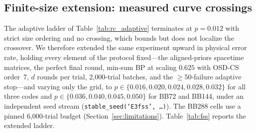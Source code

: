 \documentclass[pdflatex,sn-mathphys-num]{sn-jnl}
\theoremstyle{thmstyleone}
\theoremstyle{thmstyletwo}
\theoremstyle{thmstylethree}
\begin{document}
\subsection{Finite-size extension: measured curve crossings}
\label{ssec:fss}

The adaptive ladder of Table~\ref{tab:rc_adaptive} terminates at $p=0.012$ with strict size ordering and no crossing, which bounds but does not localize the crossover. We therefore extended the same experiment upward in physical error rate, holding every element of the protocol fixed---the aligned-priors spacetime matrices, the perfect final round, min-sum BP at scaling $0.625$ with OSD-CS order~7, $d$ rounds per trial, 2{,}000-trial batches, and the $\ge50$-failure adaptive stop---and varying only the grid, to $p\in\{0.016,0.020,0.024,0.028,0.032\}$ for all three codes and $p\in\{0.036,0.040,0.045,0.050\}$ for BB72 and BB144, under an independent seed stream (\texttt{stable\_seed(`E3fss',\,\ldots)}). The BB288 cells use a pinned 6{,}000-trial budget (Section~\ref{sec:limitations}). Table~\ref{tab:fss} reports the extended ladder.
\end{document}
